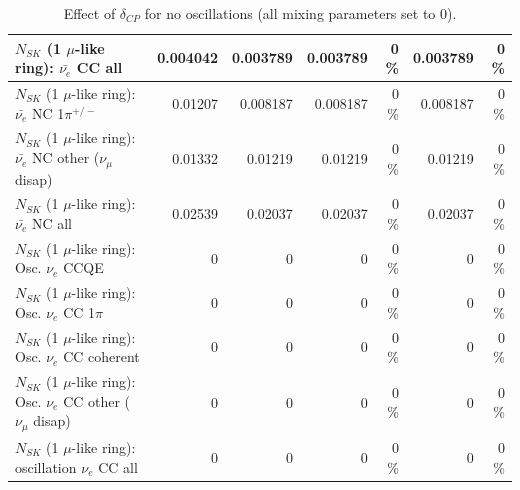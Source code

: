 \begin{table}
\begin{tabular}{| l | r | r | r  r | r  r |}
                            $N_{SK}$ (1 $\mu$-like ring): $\bar{\nu_{e}}$ CC all &        0.004042 &        0.003789 &        0.003789 &        0 \%  &        0.003789 &        0 \%  \\ 
\hline
                     $N_{SK}$ (1 $\mu$-like ring): $\bar{\nu_e}$ NC 1$\pi^{+/-}$ &         0.01207 &        0.008187 &        0.008187 &        0 \%  &        0.008187 &        0 \%  \\ 
          $N_{SK}$ (1 $\mu$-like ring): $\bar{\nu_e}$ NC other ($\nu_\mu$ disap) &         0.01332 &         0.01219 &         0.01219 &        0 \%  &         0.01219 &        0 \%  \\ 
                            $N_{SK}$ (1 $\mu$-like ring): $\bar{\nu_{e}}$ NC all &         0.02539 &         0.02037 &         0.02037 &        0 \%  &         0.02037 &        0 \%  \\ 
\hline
\hline
\hline
                                 $N_{SK}$ (1 $\mu$-like ring): Osc. $\nu_e$ CCQE &               0 &               0 &               0 &        0 \%  &               0 &        0 \%  \\ 
                            $N_{SK}$ (1 $\mu$-like ring): Osc. $\nu_e$ CC 1$\pi$ &               0 &               0 &               0 &        0 \%  &               0 &        0 \%  \\ 
                          $N_{SK}$ (1 $\mu$-like ring): Osc. $\nu_e$ CC coherent &               0 &               0 &               0 &        0 \%  &               0 &        0 \%  \\ 
           $N_{SK}$ (1 $\mu$-like ring): Osc. $\nu_e$ CC other ($\nu_\mu$ disap) &               0 &               0 &               0 &        0 \%  &               0 &        0 \%  \\ 
                        $N_{SK}$ (1 $\mu$-like ring): oscillation $\nu_e$ CC all &               0 &               0 &               0 &        0 \%  &               0 &        0 \%  \\ 
\hline
\hline
\end{tabular}
\caption{ Effect of $\delta_{CP}$ for no oscillations (all mixing parameters set to 0). }
\label{tab:num_deltacp_1RmuT_3f_osc_t13:0}
\end{table}
\clearpage
